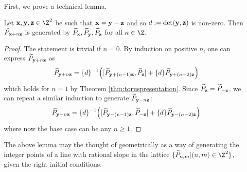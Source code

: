First, we prove a technical lemma. 
\begin{lemma} \label{lem:generateline}
Let $\xx, \yy, \zz \in \Z^2$ be  such that ${\mathbf{x}} = {\mathbf{y}}-{\mathbf{z}}$ and so $d := \det({\mathbf{y}},{\mathbf{z}})$ is non-zero. Then $\widetilde{P}_{{\mathbf{x}}+n{\mathbf{z}}}$ is generated by $\widetilde{P}_{\mathbf{x}}, \widetilde{P}_{\mathbf{y}}, \widetilde{P}_{\mathbf{z}}$ for all $n \in \Z$. 
\end{lemma}
\begin{proof}
The statement is trivial if $n=0$. By induction on positive $n$, one can express $\widetilde{P}_{{\mathbf{y}}+n{\mathbf{z}}}$ as
\[
    \widetilde{P}_{{\mathbf{y}}+n{\mathbf{z}}} = \{ d \}^{-1} \Big( [\widetilde{P}_{{\mathbf{y}}+ (n-1){\mathbf{z}}}, \widetilde{P}_{\mathbf{z}}] + \{ d \} \widetilde{P}_{{\mathbf{y}}+(n-2){\mathbf{z}}} \Big)
\]
which holds for $n=1$ by Theorem \ref{thm:toruspresentation}. Since $\widetilde{P}_{\mathbf{z}} = \widetilde{P}_{-{\mathbf{z}}}$, we can repeat a similar induction to generate $\widetilde{P}_{{\mathbf{y}} -n{\mathbf{z}}}$:
\[
    \widetilde{P}_{{\mathbf{y}}-n{\mathbf{z}}} = \{ d \}^{-1} \Big( [ \widetilde{P}_{{\mathbf{y}}-(n-1){\mathbf{z}}}, \widetilde{P}_{-{\mathbf{z}}} ] + \{ d \} \widetilde{P}_{{\mathbf{y}}-(n-2){\mathbf{z}}} \Big)
\]
where now the base case can be any $n \geq 1$. 
\end{proof}
The above lemma may the thought of geometrically as a way of generating the integer points of a line with rational slope in the lattice $\{ \widetilde{P}_{n,m} \vert (n,m) \in \Z^2 \}$, given the right initial conditions.

